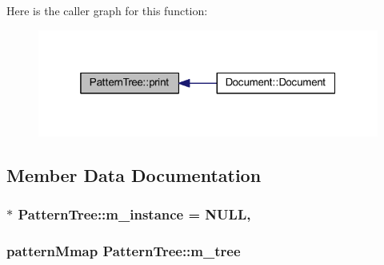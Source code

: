 Here is the caller graph for this function:\nopagebreak
\begin{figure}[H]
\begin{center}
\leavevmode
\includegraphics[width=319pt]{class_pattern_tree_a4db45bd0a698e9999c743f5ac05c33a6_icgraph}
\end{center}
\end{figure}




\subsection{Member Data Documentation}
\subsubsection[{\texorpdfstring{m\_instance}{m_instance}}]{ $\ast$ PatternTree::m\_instance = NULL\hspace{0.3cm}{\ttfamily [static]}, {\ttfamily [private]}}\hypertarget{class_pattern_tree_a84a86ffd132359390369421d1fb4c594}{}\label{class_pattern_tree_a84a86ffd132359390369421d1fb4c594}
\subsubsection[{\texorpdfstring{m\_tree}{m_tree}}]{\setlength{\rightskip}{0pt plus 5cm}patternMmap PatternTree::m\_tree\hspace{0.3cm}{\ttfamily [private]}}\hypertarget{class_pattern_tree_a8aa612fc369e9106116ad8e3e5b02021}{}\label{class_pattern_tree_a8aa612fc369e9106116ad8e3e5b02021}
